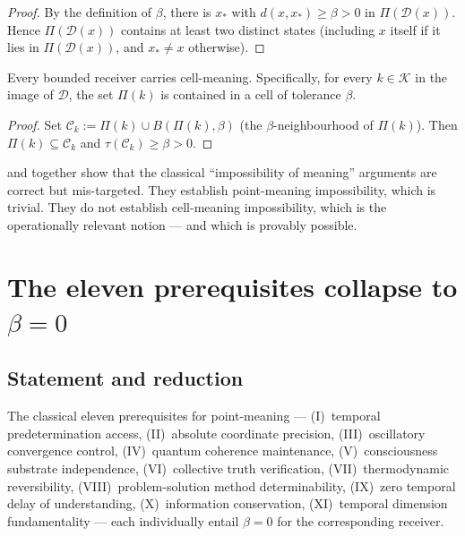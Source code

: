 \documentclass[11pt,a4paper]{article}
\newcommand{\K}{\mathcal{K}}
\newcommand{\D}{\mathcal{D}}
\newcommand{\Cell}{\mathcal{C}}
\begin{document}
\begin{proof}
By the definition of $\beta$, there is $x_*$ with
$d(x,x_*)\ge\beta>0$ in $\Pi(\D(x))$. Hence $\Pi(\D(x))$ contains at
least two distinct states (including $x$ itself if it lies in
$\Pi(\D(x))$, and $x_*\ne x$ otherwise).
\end{proof}

\begin{theorem}\label{thm:cell-meaning}
Every bounded receiver carries cell-meaning. Specifically, for every
$k\in\K$ in the image of $\D$, the set $\Pi(k)$ is contained in a
cell of tolerance $\beta$.
\end{theorem}

\begin{proof}
Set $\Cell_k:=\Pi(k)\cup B(\Pi(k),\beta)$ (the $\beta$-neighbourhood
of $\Pi(k)$). Then $\Pi(k)\subseteq\Cell_k$ and
$\tau(\Cell_k)\ge\beta>0$.
\end{proof}

\begin{remark}\label{rem:cat-err}
 and  together show that the
classical ``impossibility of meaning'' arguments are correct but
mis-targeted. They establish point-meaning impossibility, which is
trivial. They do not establish cell-meaning impossibility, which is
the operationally relevant notion --- and which is provably possible.
\end{remark}

\section{The eleven prerequisites collapse to \texorpdfstring{$\beta=0$}{beta=0}}
\label{sec:eleven}

\subsection{Statement and reduction}

\begin{theorem}\label{thm:11-collapse}
The classical eleven prerequisites for point-meaning ---
(I)~temporal predetermination access,
(II)~absolute coordinate precision,
(III)~oscillatory convergence control,
(IV)~quantum coherence maintenance,
(V)~consciousness substrate independence,
(VI)~collective truth verification,
(VII)~thermodynamic reversibility,
(VIII)~problem-solution method determinability,
(IX)~zero temporal delay of understanding,
(X)~information conservation,
(XI)~temporal dimension fundamentality ---
each individually entail $\beta=0$ for the corresponding receiver.
\end{theorem}
\end{document}
